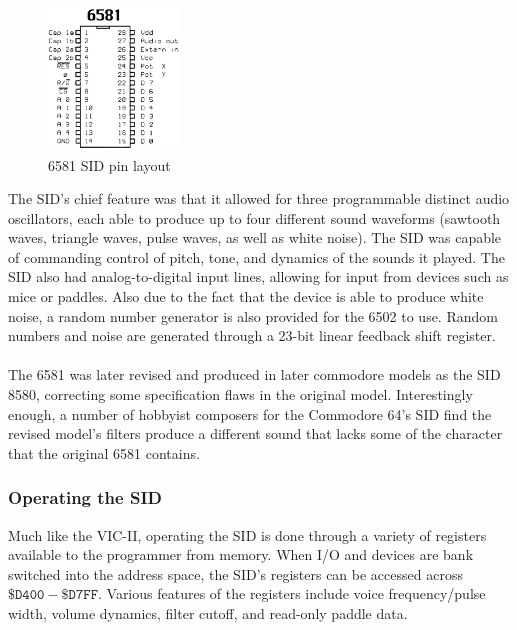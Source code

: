 \documentclass{article}
\begin{document}
\paragraph{}
\begin{figure}
\vspace{-20pt}
\begin{center}
\includegraphics[width=3.5cm]{6581}
\caption{6581 SID pin layout}
\end{center}
\end{figure}
The SID's chief feature was that it allowed for three programmable distinct audio oscillators, each able to produce up to four different sound waveforms (sawtooth waves, triangle waves, pulse waves, as well as white noise). The SID was capable of commanding control of pitch, tone, and dynamics of the sounds it played. The SID also had analog-to-digital input lines, allowing for input from devices such as mice or paddles. Also due to the fact that the device is able to produce white noise, a random number generator is also provided for the 6502 to use. Random numbers and noise are generated through a 23-bit linear feedback shift register.

\paragraph{}
The 6581 was later revised and produced in later commodore models as the SID 8580, correcting some specification flaws in the original model. Interestingly enough, a number of hobbyist composers for the Commodore 64's SID find the revised model's filters produce a different sound that lacks some of the character that the original 6581 contains.

\subsubsection{Operating the SID}
Much like the VIC-II, operating the SID is done through a variety of registers available to the programmer from memory. When I/O and devices are bank switched into the address space, the SID's registers can be accessed across $\mathtt{\$D400 - \$D7FF}$. Various features of the registers include voice frequency/pulse width, volume dynamics, filter cutoff, and read-only paddle data.
\end{document}
